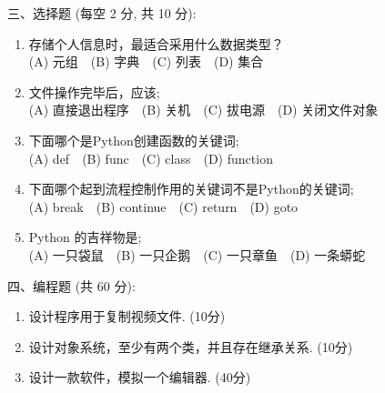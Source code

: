 \documentclass[12pt,a4paper]{ctexart}%
\begin{document}
\clearpage
%
\noindent 三、选择题 (每空 2 分, 共 10 分):%
\begin{enumerate}[1)]%
\item%
存储个人信息时，最适合采用什么数据类型？~~\mypar{}\\
(A) 元组~~(B) 字典~~(C) 列表~~(D) 集合%
\item%
文件操作完毕后，应该;~~\mypar{}\\
(A) 直接退出程序~~(B) 关机~~(C) 拔电源~~(D) 关闭文件对象%
\item%
下面哪个是Python创建函数的关键词;~~\mypar{}\\
(A) def~~(B) func~~(C) class~~(D) function%
\item%
下面哪个起到流程控制作用的关键词不是Python的关键词;~~\mypar{}\\
(A) break~~(B) continue~~(C) return~~(D) goto%
\item%
Python 的吉祥物是;~~\mypar{}\\
(A) 一只袋鼠~~(B) 一只企鹅~~(C) 一只章鱼~~(D) 一条蟒蛇%
\end{enumerate}%

%
\noindent 四、编程题 (共 60 分):%
\begin{enumerate}[1)]%
\item%
设计程序用于复制视频文件. (10分)
\item%
设计对象系统，至少有两个类，并且存在继承关系. (10分)
\item%
设计一款软件，模拟一个编辑器. (40分)
\end{enumerate}%
\end{document}
